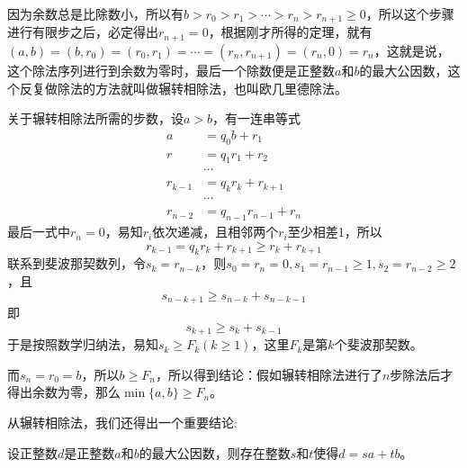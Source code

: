 因为余数总是比除数小，所以有$b > r_0 > r_1 > \cdots > r_n > r_{n+1} \geqslant 0$，所以这个步骤进行有限步之后，必定得出$r_{n+1}=0$，根据刚才所得的定理，就有$(a,b)=(b,r_0)=(r_0,r_1)=\cdots=(r_n, r_{n+1})=(r_n,0)=r_n$，这就是说，这个除法序列进行到余数为零时，最后一个除数便是正整数$a$和$b$的最大公因数，这个反复做除法的方法就叫做辗转相除法，也叫欧几里德除法。

\begin{example}[辗转相除法所需的步数]
  关于辗转相除法所需的步数，设$a>b$，有一连串等式
\begin{align*}
a & =  q_0b+r_1 \\
r & = q_1 r_1+r_2 \\
&\cdots \\
r_{k-1}&=q_k r_k + r_{k+1} \\
&\cdots \\
r_{n-2}&=q_{n-1}r_{n-1}+r_n
\end{align*}
最后一式中$r_n=0$，易知$r_i$依次递减，且相邻两个$r_i$至少相差1，所以
\[ r_{k-1}=q_k r_k + r_{k+1} \geqslant r_k + r_{k+1}  \]
联系到斐波那契数列，令$s_k=r_{n-k}$，则$s_0=r_n=0, s_1=r_{n-1} \geqslant 1,  s_2=r_{n-2} \geqslant 2$，且
\[ s_{n-k+1} \geqslant s_{n-k}+s_{n-k-1}   \]
即
\[ s_{k+1} \geqslant s_{k}+s_{k-1} \]
于是按照数学归纳法，易知$s_k \geqslant F_k(k \geqslant 1)$，这里$F_k$是第$k$个斐波那契数。

而$s_n=r_0=b$，所以$b \geqslant F_n$，所以得到结论：假如辗转相除法进行了$n$步除法后才得出余数为零，那么$\min\{a,b\} \geqslant F_n$。
\end{example}

从辗转相除法，我们还得出一个重要结论:
\begin{theorem}
  设正整数$d$是正整数$a$和$b$的最大公因数，则存在整数$s$和$t$使得$d=sa+tb$。
\end{theorem}

